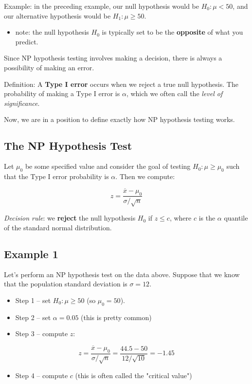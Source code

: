 \documentclass[11pt]{article}
\begin{document}
Example: in the preceding example, our null hypothesis would be $H_0:\mu<50$, and our alternative hypothesis would be $H_1:\mu\geq 50$.  

\begin{itemize}
\item note: the null hypothesis $H_0$ is typically set to be the \textbf{opposite} of what you predict.
\end{itemize}

Since NP hypothesis testing involves making a decision, there is always a possibility of making an error.

Definition: A \textbf{Type I error} occurs when we reject a true null hypothesis.  The probability of making a Type I error is $\alpha$, which we often call the \emph{level of significance}.

Now, we are in a position to define exactly how NP hypothesis testing works.

\subsection*{The NP Hypothesis Test}
\label{sec-1-1}
Let $\mu_0$ be some specified value and consider the goal of testing $H_0:\mu\geq \mu_0$ such that the Type I error probability is $\alpha$.  Then we compute:

\[
z=\frac{\overline{x}-\mu_0}{\sigma / \sqrt{n}}
\]

\emph{Decision rule}:  we \textbf{reject} the null hypothesis $H_0$ if $z\leq c$, where $c$ is the $\alpha$ quantile of the standard normal distribution.

\subsection*{Example 1}
\label{sec-1-2}
Let's perform an NP hypothesis test on the data above.  Suppose that we know that the population standard deviation is $\sigma=12$. 

\begin{itemize}
\item Step 1 -- set $H_0: \mu\geq 50$ (so $\mu_0=50$).
\item Step 2 -- set $\alpha=0.05$ (this is pretty common)
\item Step 3 -- compute $z$:
\end{itemize}

\[
z=\frac{\overline{x}-\mu_0}{\sigma / \sqrt{n}} = \frac{44.5-50}{12 / \sqrt{10}} = -1.45
\]

\begin{itemize}
\item Step 4 -- compute $c$ (this is often called the "critical value")
\end{itemize}
\end{document}
